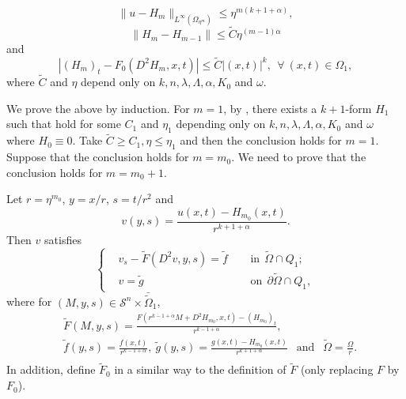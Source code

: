 \documentclass[preprint,12pt]{elsarticle}
\theoremstyle{definition}
\theoremstyle{remark}
\numberwithin{equation}{section}
\begin{document}
\begin{equation}\label{e.tCkas-6}
\|u-H_m\|_{L^{\infty }(\Omega _{\eta^{m}})}\leq \eta ^{m(k+1+\alpha )},
\end{equation}
\begin{equation}\label{e.tCkas-7}
\|H_m-H_{m-1}\|\leq \tilde{C}\eta ^{(m-1)\alpha}
\end{equation}
and
\begin{equation}\label{e.tCkas-9}
|(H_m)_t-F_0(D^2H_m,x,t)|\leq \tilde{C}|(x,t)|^{k}, ~~\forall ~(x,t)\in \Omega_{1},
\end{equation}
where $\tilde{C}$ and $\eta$ depend only on $k,n,\lambda, \Lambda,\alpha,K_0$ and $\omega$.

We prove the above by induction. For $m=1$, by , there exists a $k+1$-form $H_1$ such that  hold for some $C_1$ and $\eta_1$ depending only on $k,n,\lambda, \Lambda,\alpha,K_0$ and $\omega$ where $H_0\equiv 0$. Take $\tilde{C}\geq C_1, \eta\leq \eta_1$ and then the conclusion holds for $m=1$. Suppose that the conclusion holds for $m=m_0$. We need to prove that the conclusion holds for $m=m_0+1$.

Let $r=\eta ^{m_{0}}$, $y=x/r$, $s=t/r^2$ and
\begin{equation}\label{e.tCkas-v}
  v(y,s)=\frac{u(x,t)-H_{m_0}(x,t)}{r^{k+1+\alpha}}.
\end{equation}
Then $v$ satisfies
\begin{equation}\label{e.Ckas-F}
\left\{\begin{aligned}
&v_s-\tilde{F}(D^2v,y,s)=\tilde{f}&& ~~\mbox{in}~~\tilde{\Omega}\cap Q_1;\\
&v=\tilde{g}&& ~~\mbox{on}~~\partial \tilde{\Omega}\cap Q_1,
\end{aligned}\right.
\end{equation}
where for $(M,y,s)\in \mathcal {S}^n\times \bar{\tilde\Omega}_1$,
\begin{equation*}
  \begin{aligned}
&\tilde{F}(M,y,s)=\frac{F(r^{k-1+\alpha}M+D^2H_{m_0},x,t)-(H_{m_0})_t}{r^{k-1+\alpha}},\\
&\tilde{f}(y,s)=\frac{f(x,t)}{r^{k-1+\alpha}},~
\tilde{g}(y,s)=\frac{g(x,t)-H_{m_0}(x,t)}{r^{k+1+\alpha}}~~\mbox{ and }~~\tilde{\Omega}=\frac{\Omega}{r}.\\
  \end{aligned}
\end{equation*}
In addition, define $\tilde{F}_0$ in a similar way to the definition of $\tilde{F}$ (only replacing $F$ by $F_0$).
\end{document}
